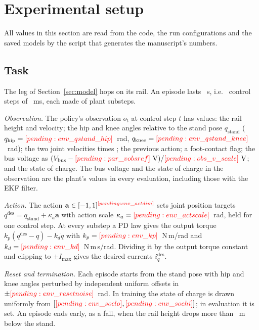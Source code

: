 \section{Experimental setup}\label{sec:setup}
All values in this section are read from the code, the run configurations and the saved models by the script that generates the manuscript's numbers.

\subsection{Task}\label{sec:task}
The leg of Section~\ref{sec:model} hops on its rail. An episode lasts ~s, i.e.\  control steps of ~ms, each made of  plant substeps.

\emph{Observation.} The policy's observation $o_t$ at control step $t$ has  values: the rail height and velocity; the hip and knee angles relative to the stand pose $q_{\mathrm{stand}}$ ($q_{\mathrm{hip}}=\res{env_qstand_hip}$~rad, $q_{\mathrm{knee}}=\res{env_qstand_knee}$~rad); the two joint velocities times ; the previous action; a foot-contact flag; the bus voltage as $(\Vb-\res{par_vobsref}~\mathrm{V})/\res{obs_v_scale}~\mathrm{V}$; and the state of charge. The bus voltage and the state of charge in the observation are the plant's values in every evaluation, including those with the EKF filter.

\emph{Action.} The action $\mathbf a\in[-1,1]^{\res{env_actdim}}$ sets joint position targets $q^{\mathrm{des}} = q_{\mathrm{stand}} + \kappa_a\mathbf a$ with action scale $\kappa_a=\res{env_actscale}$~rad, held for one control step. At every substep a PD law gives the output torque $k_p(q^{\mathrm{des}}-q) - k_d\dot q$ with $k_p=\res{env_kp}$~N\,m/rad and $k_d=\res{env_kd}$~N\,m\,s/rad. Dividing it by the output torque constant and clipping to $\pm I_{\max}$ gives the desired currents $i_q^{\mathrm{des}}$.

\emph{Reset and termination.} Each episode starts from the stand pose with hip and knee angles perturbed by independent uniform offsets in $\pm\res{env_resetnoise}$~rad. In training the state of charge is drawn uniformly from $[\res{env_soclo},\res{env_sochi}]$; in evaluation it is set. An episode ends early, as a fall, when the rail height drops more than ~m below the stand.

